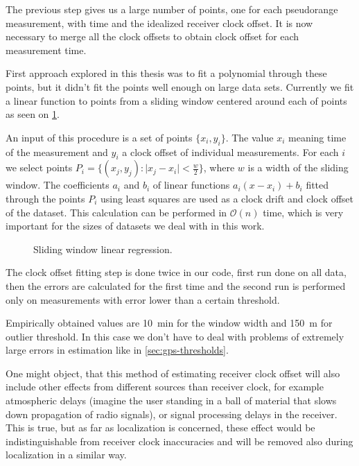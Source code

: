 The previous step gives us a large number of points, one for each pseudorange
measurement, with time and the idealized receiver clock offset.
It is now necessary to merge all the clock offsets to obtain clock offset for
each measurement time.

First approach explored in this thesis was to fit a polynomial through these
points, but it didn't fit the points well enough on large data sets.
Currently we fit a linear function to points from a sliding window centered
around each of points as seen on \cref{fig:sliding-window-linear-regression}.

An input of this procedure is a set of points \(\{x_i, y_i\}\).
The value \(x_i\) meaning time of the measurement and 
\(y_i\) a clock offset of individual measurements.
For each \(i\) we select points \(P_i = \{(x_j, y_j) : \lvert{}x_j - x_i\rvert < \frac{w}{2}\}\), where
\(w\) is a width of the sliding window.
The coefficients \(a_i\) and \(b_i\) of linear functions
\(a_i (x - x_i) + b_i\) fitted through the points \(P_i\) using least squares
are used as a clock drift and clock offset of the dataset.
This calculation can be performed in \(\mathcal{O}(n)\) time, which is very
important for the sizes of datasets we deal with in this work.


\begin{figure}[h]
	\centering
	
	\caption{Sliding window linear regression.}
	\label{fig:sliding-window-linear-regression}
\end{figure}

The clock offset fitting step is done twice in our code, first run done on
all data, then the errors are calculated for the first time and the second run
is performed only on measurements with error lower than a certain threshold.

Empirically obtained values are \SI{10}{\minute} for the window width and
\SI{150}{\meter} for outlier threshold.
In this case we don't have to deal with problems of extremely large errors in estimation
like in \cref{sec:gps-thresholds}.

One might object, that this method of estimating receiver clock offset will
also include other effects from different sources than receiver clock,
for example atmospheric delays (imagine the user standing in a ball of material
that slows down propagation of radio signals), or signal processing delays
in the receiver.
This is true, but as far as localization is concerned, these effect would
be indistinguishable from receiver clock inaccuracies and will be
removed also during localization in a similar way.

